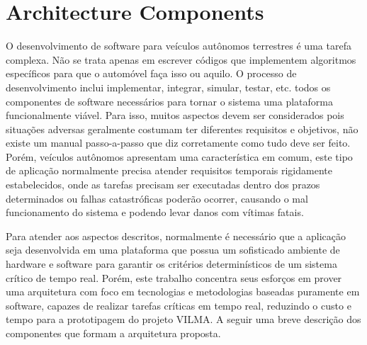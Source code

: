 \documentclass[conference]{IEEEtran}
\begin{document}

\section{Architecture Components}\label{sec:architec_components}

O desenvolvimento de software para veículos autônomos terrestres é uma tarefa complexa. Não se trata apenas em escrever códigos que implementem algoritmos específicos para que o automóvel faça isso ou aquilo. O processo de desenvolvimento inclui implementar, integrar, simular, testar, etc. todos os componentes de software necessários para tornar o sistema uma plataforma funcionalmente viável. Para isso, muitos aspectos devem ser considerados pois situações adversas geralmente costumam ter diferentes requisitos e objetivos, não existe um manual passo-a-passo que diz corretamente como tudo deve ser feito. Porém, veículos autônomos apresentam uma característica em comum, este tipo de aplicação normalmente precisa atender requisitos temporais rigidamente estabelecidos, onde as tarefas precisam ser executadas dentro dos prazos determinados ou falhas catastróficas poderão ocorrer, causando o mal funcionamento do sistema e podendo levar danos com vítimas fatais.

Para atender aos aspectos descritos, normalmente é necessário que a aplicação seja desenvolvida em uma plataforma que possua um sofisticado ambiente de hardware e software para garantir os critérios determinísticos de um sistema crítico de tempo real. Porém, este trabalho concentra seus esforços em prover uma arquitetura com foco em tecnologias e metodologias baseadas puramente em software, capazes de realizar tarefas críticas em tempo real, reduzindo o custo e tempo para a prototipagem do projeto VILMA. A seguir uma breve descrição dos componentes que formam a arquitetura proposta.

\end{document}
